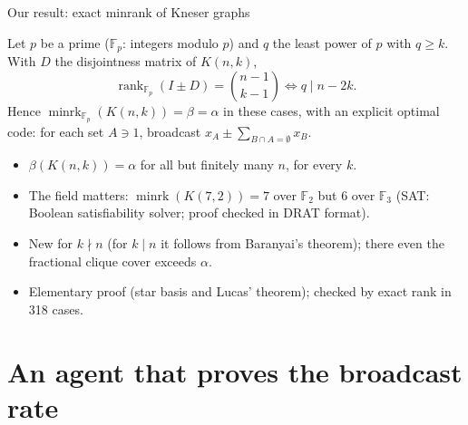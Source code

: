 \documentclass[11pt]{beamer}
\newcommand{\Fp}{\mathbb{F}_p}
\begin{document}
\begin{frame}{Our result: exact minrank of Kneser graphs}
  \begin{theorem}[ours]
    Let $p$ be a prime ($\Fp$: integers modulo $p$) and $q$ the least power of $p$ with $q \ge k$. With $D$ the disjointness matrix of $K(n,k)$,
    \[ \operatorname{rank}_{\Fp}(I \pm D) = \binom{n-1}{k-1} \iff q \mid n-2k . \]
    Hence $\operatorname{minrk}_{\Fp}(K(n,k)) = \beta = \alpha$ in these cases, with an explicit optimal code: for each
    set $A \ni 1$, broadcast $x_A \pm \sum_{B \cap A = \emptyset} x_B$.
  \end{theorem}
  \begin{itemize}\small
    \item $\beta(K(n,k)) = \alpha$ for all but finitely many $n$, for every $k$.
    \item The field matters: $\operatorname{minrk}(K(7,2)) = 7$ over $\mathbb{F}_2$ but $6$ over $\mathbb{F}_3$
          (SAT: Boolean satisfiability solver; proof checked in DRAT format).
    \item New for $k \nmid n$ (for $k \mid n$ it follows from Baranyai's theorem); there even the fractional clique
          cover exceeds $\alpha$.
    \item Elementary proof (star basis and Lucas' theorem); checked by exact rank in 318 cases.
  \end{itemize}
\end{frame}

\section{An agent that proves the broadcast rate}
\end{document}
